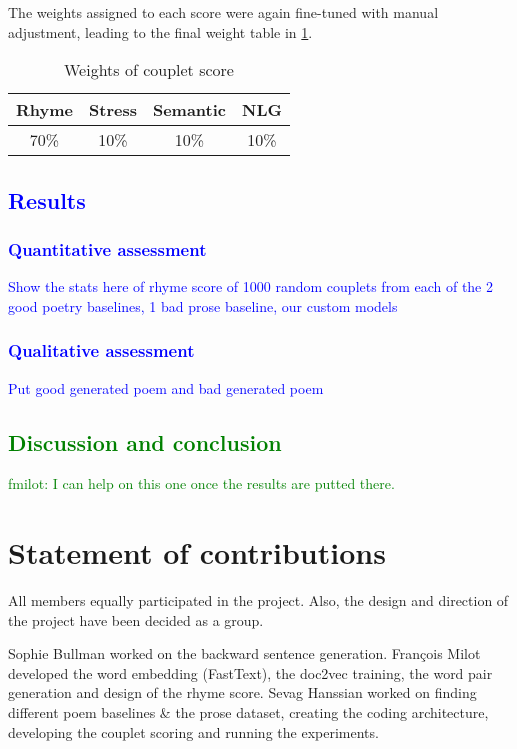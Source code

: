 \documentclass[11pt,a4paper]{article}
\begin{document}
The weights assigned to each score were again fine-tuned with manual adjustment, leading to the final weight table in \ref{table:weight_couplet_score}.

\begin{table}[ht]
\centering
\begin{tabular}{c c c c}
	\hline\hline
	Rhyme & Stress & Semantic & NLG \\ [0.5ex]
	\hline
	70\% & 10\% & 10\% & 10\% \\ [0.5ex]
	\hline
\end{tabular}
\caption{Weights of couplet score}
\label{table:weight_couplet_score}
\end{table}

\textcolor{blue}{
\subsection{Results}
\label{sec:results}
\subsubsection{Quantitative assessment}
Show the stats here of rhyme score of 1000 random couplets from each of the 2 good poetry baselines, 1 bad prose baseline, our custom models
\subsubsection{Qualitative assessment}
Put good generated poem and bad generated poem
}

\textcolor{green}{
\section{Discussion and conclusion}
\label{sec:discconc}
fmilot: I can help on this one once the results are putted there.
}


\section{Statement of contributions}
\label{sec:contributions}
All members equally participated in the project. Also, the design and direction of the project have been decided as a group. 

Sophie Bullman worked on the backward sentence generation. François Milot developed the word embedding (FastText), the doc2vec training, the word pair generation and design of the rhyme score. Sevag Hanssian worked on finding different poem baselines \& the prose dataset, creating the coding architecture, developing the couplet scoring and running the experiments.



\end{document}
